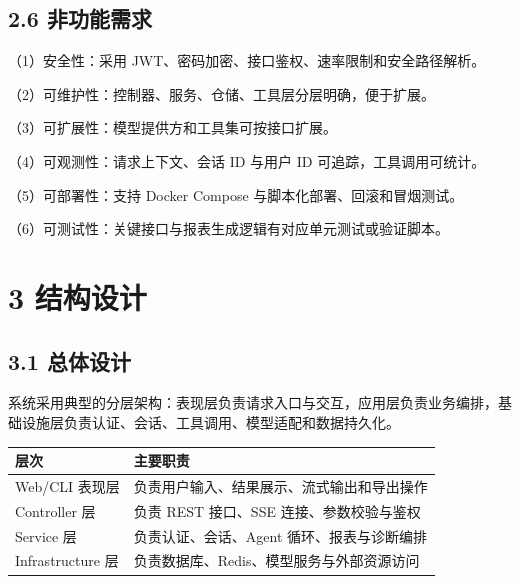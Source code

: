 \documentclass[UTF8]{ctexart}
\begin{document}
\subsection{\texorpdfstring{\textbf{2.6
非功能需求}}{2.6 非功能需求}}\label{ux975eux529fux80fdux9700ux6c42}

（1）安全性：采用 JWT、密码加密、接口鉴权、速率限制和安全路径解析。

（2）可维护性：控制器、服务、仓储、工具层分层明确，便于扩展。

（3）可扩展性：模型提供方和工具集可按接口扩展。

（4）可观测性：请求上下文、会话 ID 与用户 ID 可追踪，工具调用可统计。

（5）可部署性：支持 Docker Compose 与脚本化部署、回滚和冒烟测试。

（6）可测试性：关键接口与报表生成逻辑有对应单元测试或验证脚本。

\section{\texorpdfstring{\textbf{3
结构设计}}{3 结构设计}}\label{ux7ed3ux6784ux8bbeux8ba1}

\subsection{\texorpdfstring{\textbf{3.1
总体设计}}{3.1 总体设计}}\label{ux603bux4f53ux8bbeux8ba1}

系统采用典型的分层架构：表现层负责请求入口与交互，应用层负责业务编排，基础设施层负责认证、会话、工具调用、模型适配和数据持久化。

\begin{longtable}[]{@{}
  >{\raggedright\arraybackslash}p{}
  >{\raggedright\arraybackslash}p{}@{}}
\toprule\noalign{}
\begin{minipage}[b]{\linewidth}\raggedright
层次
\end{minipage} & \begin{minipage}[b]{\linewidth}\raggedright
主要职责
\end{minipage} \\
\midrule\noalign{}
\endhead
\bottomrule\noalign{}
\endlastfoot
Web/CLI 表现层 & 负责用户输入、结果展示、流式输出和导出操作 \\
Controller 层 & 负责 REST 接口、SSE 连接、参数校验与鉴权 \\
Service 层 & 负责认证、会话、Agent 循环、报表与诊断编排 \\
Infrastructure 层 & 负责数据库、Redis、模型服务与外部资源访问 \\
\end{longtable}
\end{document}
